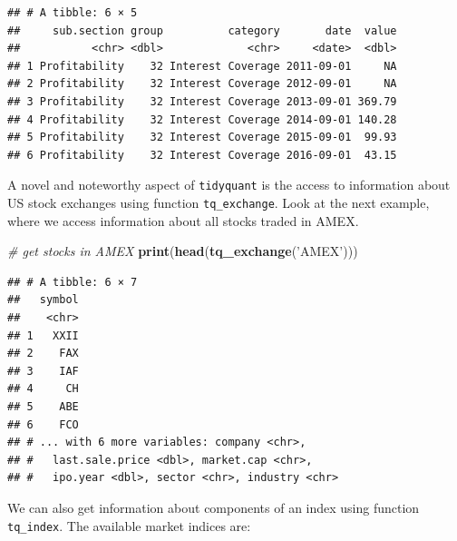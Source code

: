 \documentclass[11pt,]{book}
\newenvironment{Shaded}{\begin{snugshade}}{\end{snugshade}}
\newcommand{\KeywordTok}[1]{\textcolor[rgb]{0.27,0.27,0.27}{\textbf{#1}}}
\newcommand{\DecValTok}[1]{\textcolor[rgb]{0.06,0.06,0.06}{#1}}
\newcommand{\StringTok}[1]{\textcolor[rgb]{0.5,0.5,0.5}{#1}}
\newcommand{\CommentTok}[1]{\textcolor[rgb]{0.56,0.35,0.01}{\textit{#1}}}
\newcommand{\OperatorTok}[1]{\textcolor[rgb]{0.81,0.36,0.00}{\textbf{#1}}}
\newcommand{\NormalTok}[1]{#1}
\begin{document}
\begin{Shaded}
\end{Shaded}

\begin{verbatim}
## # A tibble: 6 × 5
##     sub.section group          category       date  value
##           <chr> <dbl>             <chr>     <date>  <dbl>
## 1 Profitability    32 Interest Coverage 2011-09-01     NA
## 2 Profitability    32 Interest Coverage 2012-09-01     NA
## 3 Profitability    32 Interest Coverage 2013-09-01 369.79
## 4 Profitability    32 Interest Coverage 2014-09-01 140.28
## 5 Profitability    32 Interest Coverage 2015-09-01  99.93
## 6 Profitability    32 Interest Coverage 2016-09-01  43.15
\end{verbatim}

A novel and noteworthy aspect of \texttt{tidyquant} is the access to
information about US stock exchanges using function
\texttt{tq\_exchange}. Look at the next example, where we access
information about all stocks traded in AMEX.

\begin{Shaded}
\begin{Highlighting}[]
\CommentTok{# get stocks in AMEX}
\KeywordTok{print}\NormalTok{(}\KeywordTok{head}\NormalTok{(}\KeywordTok{tq_exchange}\NormalTok{(}\StringTok{'AMEX'}\NormalTok{)))}
\end{Highlighting}
\end{Shaded}

\begin{verbatim}
## # A tibble: 6 × 7
##   symbol
##    <chr>
## 1   XXII
## 2    FAX
## 3    IAF
## 4     CH
## 5    ABE
## 6    FCO
## # ... with 6 more variables: company <chr>,
## #   last.sale.price <dbl>, market.cap <chr>,
## #   ipo.year <dbl>, sector <chr>, industry <chr>
\end{verbatim}

We can also get information about components of an index using function
\texttt{tq\_index}. The available market indices are:
\end{document}
